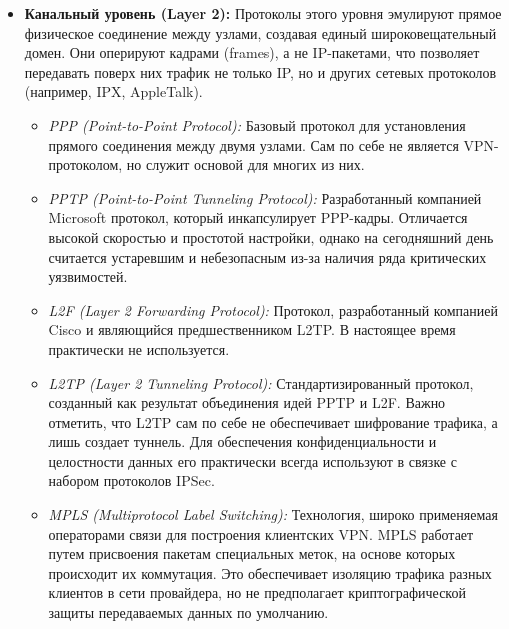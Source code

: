 \begin{itemize}
    \item \textbf{Канальный уровень (Layer 2):}
    Протоколы этого уровня эмулируют прямое физическое соединение между узлами, создавая единый широковещательный домен. Они оперируют кадрами (frames), а не IP-пакетами, что позволяет передавать поверх них трафик не только IP, но и других сетевых протоколов (например, IPX, AppleTalk).
    \begin{itemize}
        \item \textit{PPP (Point-to-Point Protocol):} Базовый протокол для установления прямого соединения между двумя узлами. Сам по себе не является VPN-протоколом, но служит основой для многих из них.
        \item \textit{PPTP (Point-to-Point Tunneling Protocol):} Разработанный компанией Microsoft протокол, который инкапсулирует PPP-кадры. Отличается высокой скоростью и простотой настройки, однако на сегодняшний день считается устаревшим и небезопасным из-за наличия ряда критических уязвимостей.
        \item \textit{L2F (Layer 2 Forwarding Protocol):} Протокол, разработанный компанией Cisco и являющийся предшественником L2TP. В настоящее время практически не используется.
        \item \textit{L2TP (Layer 2 Tunneling Protocol):} Стандартизированный протокол, созданный как результат объединения идей PPTP и L2F. Важно отметить, что L2TP сам по себе не обеспечивает шифрование трафика, а лишь создает туннель. Для обеспечения конфиденциальности и целостности данных его практически всегда используют в связке с набором протоколов IPSec.
        \item \textit{MPLS (Multiprotocol Label Switching):} Технология, широко применяемая операторами связи для построения клиентских VPN. MPLS работает путем присвоения пакетам специальных меток, на основе которых происходит их коммутация. Это обеспечивает изоляцию трафика разных клиентов в сети провайдера, но не предполагает криптографической защиты передаваемых данных по умолчанию.
    \end{itemize}


\end{itemize}
